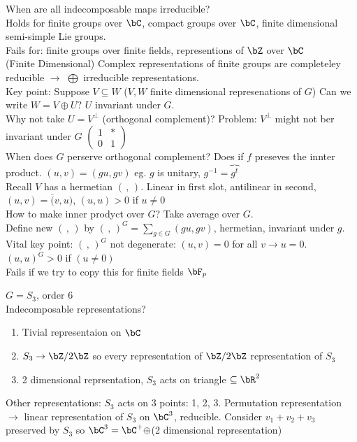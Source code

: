 \noindent
When are all indecomposable maps irreducible? \\
Holds for finite groups over $\bC$, compact groups over $\bC$, finite dimensional semi-simple Lie groups. \\
Fails for: finite groups over finite fields, representions of $\bZ$ over $\bC$ \\
(Finite Dimensional) Complex representations of finite groups are completeley reducible $\to$ $\bigoplus$ irreducible representations. \\
Key point: Suppose $V \subseteq W$ ($V, W$ finite dimensional represenations of $G$) Can we write $W = V \oplus U$? $U$ invariant under $G$. \\
Why not take $U = V^{\perp}$ (orthogonal complement)? Problem: $V^{\perp}$ might not ber invariant under $G$ $\begin{pmatrix} 1 & * \\ 0 & 1 \end{pmatrix}$ \\
When does $G$ perserve orthogonal complement? Does if $f$ preseves the innter product. $(u, v) = (gu, gv)$ eg. $g$ is unitary, $g^{-1} = \overbrace{g^t}$ \\
Recall $V$ has a hermetian $(\, , \, )$. Linear in first slot, antilinear in second, $(u, v) = \overline(v,u)$, $(u,u)>0$ if $u \neq 0$ \\
How to make inner prodyct over $G$? Take average over $G$. \\
Define new $(\, , \, )$ by $( \, , \, )^G = \sum_{g \in G}(gu, gv)$, hermetian, invariant under $g$. \\
Vital key point: $( \, , \, )^G$ not degenerate: $(u, v)=0$ for all $v \to u=0$. $(u, u)^G >0$ if $(u \neq 0)$ \\
Fails if we try to copy this for finite fields $\bF_p$ 

\begin{example}
    $G = S_3$, order 6 \\
    Indecomposable representations? 
    \begin{enumerate}
        \item Tivial representaion on $\bC$ 
        \item $S_3 \to \bZ/2\bZ$ so every representation of $\bZ/2\bZ$ representation of $S_3$ 
        \item 2 dimensional reprsentation, $S_3$ acts on triangle $\subseteq \bR^2$ 
    \end{enumerate}
    Other representations: $S_3$ acts on 3 points: 1, 2, 3. Permutation representation $\to$ linear representation of $S_3$ on $\bC^3$, reducible. Consider $v_1 + v_2 + v_3$ preserved by $S_3$ so $\bC^3 = \bC^+ \oplus $(2 dimensional representation)
\end{example}

